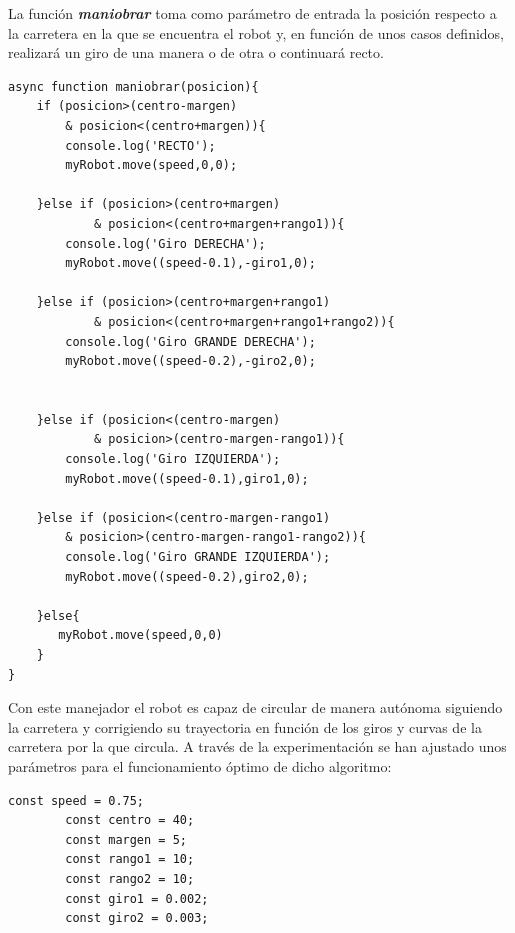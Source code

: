 \documentclass{report}
\begin{document}
La función \textit{\textbf{maniobrar}} toma como parámetro de entrada la posición respecto a la carretera en la que se encuentra el robot y, en función de unos casos definidos, realizará un giro de una manera o de otra o continuará recto.

\newpage
\begin{lstlisting}[backgroundcolor = \color{light-gray},
				   aboveskip = 2em,
				   belowskip = 2em,
                   xleftmargin = 2cm,
                   framexleftmargin = 1em,
                   basicstyle=\small]
async function maniobrar(posicion){
    if (posicion>(centro-margen) 
    	& posicion<(centro+margen)){
        console.log('RECTO');
        myRobot.move(speed,0,0);

    }else if (posicion>(centro+margen) 
    		& posicion<(centro+margen+rango1)){
        console.log('Giro DERECHA');
        myRobot.move((speed-0.1),-giro1,0);

    }else if (posicion>(centro+margen+rango1) 
    		& posicion<(centro+margen+rango1+rango2)){
        console.log('Giro GRANDE DERECHA');
        myRobot.move((speed-0.2),-giro2,0);


    }else if (posicion<(centro-margen) 
    		& posicion>(centro-margen-rango1)){
        console.log('Giro IZQUIERDA');
        myRobot.move((speed-0.1),giro1,0);

    }else if (posicion<(centro-margen-rango1) 
    	& posicion>(centro-margen-rango1-rango2)){
        console.log('Giro GRANDE IZQUIERDA');
        myRobot.move((speed-0.2),giro2,0);

    }else{
       myRobot.move(speed,0,0)
    }
}
\end{lstlisting}

Con este manejador el robot es capaz de circular de manera autónoma siguiendo la carretera y corrigiendo su trayectoria en función de los giros y curvas de la carretera por la que circula. A través de la experimentación se han ajustado unos parámetros para el funcionamiento óptimo de dicho algoritmo:

\begin{lstlisting}[backgroundcolor = \color{light-gray},
				   aboveskip = 2em,
				   belowskip = 2em,
                   xleftmargin = 2cm,
                   framexleftmargin = 1em,
                   basicstyle=\small]
		const speed = 0.75;
		const centro = 40;
		const margen = 5;
		const rango1 = 10;
		const rango2 = 10;
		const giro1 = 0.002;
		const giro2 = 0.003;
\end{lstlisting}
 
\end{document}
